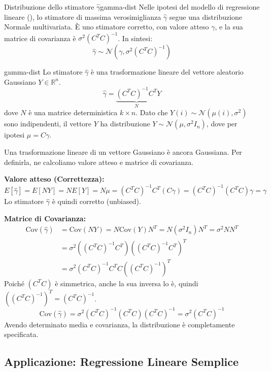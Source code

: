 \begin{proposizione}{Distribuzione dello stimatore $\hat{\gamma}$}{gamma-dist}
Nelle ipotesi del modello di regressione lineare (), lo stimatore di massima verosimiglianza $\hat{\gamma}$ segue una distribuzione Normale multivariata. È uno stimatore corretto, con valore atteso $\gamma$, e la sua matrice di covarianza è $\sigma^2(C^TC)^{-1}$.
In sintesi:
\[
\hat{\gamma} \sim \mathcal{N}(\gamma, \sigma^2 (C^T C)^{-1})
\]
\end{proposizione}

\begin{dimostrazione}{}{gamma-dist}
Lo stimatore $\hat{\gamma}$ è una trasformazione lineare del vettore aleatorio Gaussiano $Y \in \mathbb{R}^n$.
\[
\hat{\gamma} = \underbrace{(C^T C)^{-1} C^T}_{N} Y
\]
dove $N$ è una matrice deterministica $k \times n$.
Dato che $Y(i) \sim \mathcal{N}(\mu(i), \sigma^2)$ sono indipendenti, il vettore $Y$ ha distribuzione $Y \sim \mathcal{N}(\mu, \sigma^2 I_n)$, dove per ipotesi $\mu = C\gamma$.

Una trasformazione lineare di un vettore Gaussiano è ancora Gaussiana. Per definirla, ne calcoliamo valore atteso e matrice di covarianza.

\textbf{Valore atteso (Correttezza):}
\[
E[\hat{\gamma}] = E[NY] = NE[Y] = N\mu = (C^T C)^{-1} C^T (C\gamma) = (C^T C)^{-1} (C^T C) \gamma = \gamma
\]
Lo stimatore $\hat{\gamma}$ è quindi corretto (unbiased).

\textbf{Matrice di Covarianza:}
\begin{align*}
\text{Cov}(\hat{\gamma}) &= \text{Cov}(NY) = N \text{Cov}(Y) N^T = N (\sigma^2 I_n) N^T = \sigma^2 NN^T \\
&= \sigma^2 \left((C^T C)^{-1} C^T\right) \left((C^T C)^{-1} C^T\right)^T \\
&= \sigma^2 (C^T C)^{-1} C^T C ((C^T C)^{-1})^T
\end{align*}
Poiché $(C^T C)$ è simmetrica, anche la sua inversa lo è, quindi $((C^T C)^{-1})^T = (C^T C)^{-1}$.
\[
\text{Cov}(\hat{\gamma}) = \sigma^2 (C^T C)^{-1} (C^T C) (C^T C)^{-1} = \sigma^2 (C^T C)^{-1}
\]
Avendo determinato media e covarianza, la distribuzione è completamente specificata.
\end{dimostrazione}


\subsection{Applicazione: Regressione Lineare Semplice}

